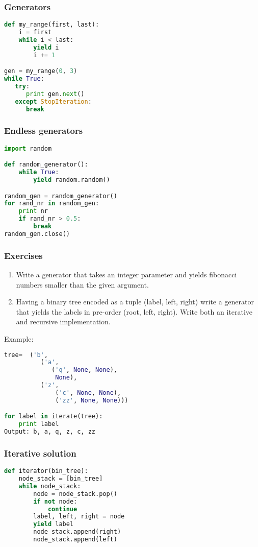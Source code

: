 \documentclass{beamer}
\begin{document}
\begin{frame}[fragile]
\frametitle{Generators}
\vspace{5 mm}
\begin{lstlisting}[language=python]
def my_range(first, last):
    i = first
    while i < last:
        yield i
        i += 1

gen = my_range(0, 3)
while True:
   try:
      print gen.next()
   except StopIteration:
      break
\end{lstlisting}
\end{frame}

\begin{frame}[fragile]
\frametitle{Endless generators}
\vspace{5 mm}
\begin{lstlisting}[language=python]
import random

def random_generator():
    while True:
        yield random.random()

random_gen = random_generator()
for rand_nr in random_gen:
    print nr
    if rand_nr > 0.5:
        break
random_gen.close()
\end{lstlisting}
\end{frame}

\begin{frame}[fragile]
\frametitle{Exercises}
\begin{enumerate}
  \item Write a generator that takes an integer parameter and yields fibonacci numbers
    smaller than the given argument.
  \item Having a binary tree encoded as a tuple (label, left, right) write a generator that
    yields the labels in pre-order (root, left, right). Write both an iterative and recursive
    implementation.
\end{enumerate}
Example:
\begin{lstlisting}[language=python]
tree=  ('b',
          ('a',
             ('q', None, None),
              None),
          ('z',
              ('c', None, None),
              ('zz', None, None)))

for label in iterate(tree):
    print label
Output: b, a, q, z, c, zz
\end{lstlisting}
\end{frame}


\begin{frame}[fragile]
\frametitle{Iterative solution}
\begin{lstlisting}[language=python]
def iterator(bin_tree):
    node_stack = [bin_tree]
    while node_stack:
        node = node_stack.pop()
        if not node:
            continue
        label, left, right = node
        yield label
        node_stack.append(right)
        node_stack.append(left)
\end{lstlisting}
\end{frame}
\end{document}
